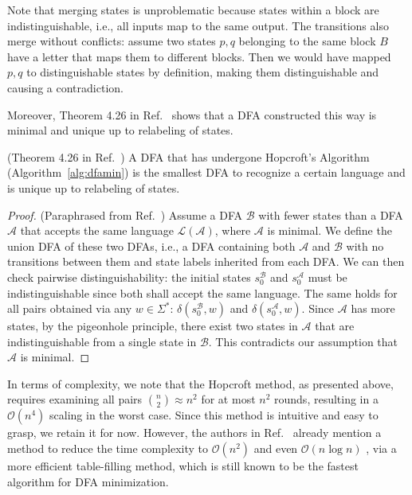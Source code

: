 \documentclass[../main.tex]{subfiles}
\begin{document}
Note that merging states is unproblematic because states within a block are indistinguishable, i.e., all inputs map to the same output. The transitions also merge without conflicts: assume two states $p,q$ belonging to the same block $B$ have a letter that maps them to different blocks. Then we would have mapped $p,q$ to distinguishable states by definition, making them distinguishable and causing a contradiction.

Moreover, Theorem 4.26 in Ref.~\cite{hopcroft2001introduction} shows that a \ac{DFA} constructed this way is minimal and unique up to relabeling of states.

\begin{theorem}\label{thr:minimaldfa} (Theorem 4.26 in Ref.~\cite{hopcroft2001introduction})  A DFA that has undergone Hopcroft's  Algorithm (Algorithm~\ref{alg:dfamin}) is the smallest DFA to recognize a certain language and is unique up to relabeling of states.
\end{theorem}

\begin{proof} (Paraphrased from Ref.~\cite{hopcroft2001introduction}) Assume a DFA $\mathcal{B}$ with fewer states than a DFA $\mathcal{A}$ that accepts the same language $\mathcal{L}(\mathcal{A})$, where $\mathcal{A}$ is minimal. We define the union DFA of these two DFAs, i.e., a DFA containing both $\mathcal{A}$ and $\mathcal{B}$ with no transitions between them and state labels inherited from each DFA. We can then check pairwise distinguishability: the initial states $s_0^{\mathcal{B}}$ and $s_0^{\mathcal{A}}$ must be indistinguishable since both shall accept the same language. The same holds for all pairs obtained via any $w \in \Sigma^*$: $\delta(s_0^{\mathcal{B}},w)$ and $\delta(s_0^{\mathcal{A}},w)$. Since $\mathcal{A}$ has more states, by the pigeonhole principle, there exist two states in $\mathcal{A}$ that are indistinguishable from a single state in $\mathcal{B}$. This contradicts our assumption that $\mathcal{A}$ is minimal.
\end{proof}

In terms of complexity, we note that the Hopcroft method, as presented above, requires examining all pairs $\binom{n}{2} \approx n^2$ for at most $n^2$ rounds, resulting in a $\mathcal{O}(n^4)$ scaling in the worst case. Since this method is intuitive and easy to grasp, we retain it for now. However, the authors in Ref.~\cite{hopcroft2001introduction} already mention a method to reduce the time complexity to $\mathcal{O}(n^2)$ and even $\mathcal{O}(n \log n)$ \cite{knuutila2001re, berstel2010minimization}, via a more efficient table-filling method, which is still known to be the fastest algorithm for \ac{DFA} minimization.
\end{document}
